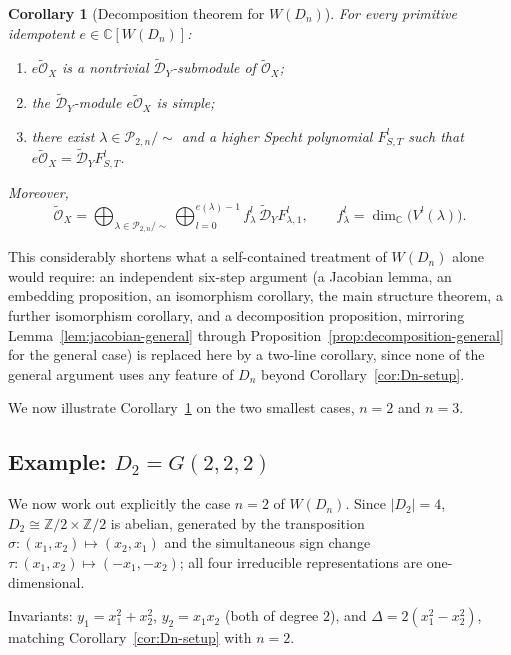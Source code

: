 \documentclass[11pt,a4paper]{article}
\newtheorem{corollary}[theorem]{Corollary}
\begin{document}
\begin{corollary}[Decomposition theorem for $W(D_n)$]\label{cor:Dn-main}
For every primitive idempotent $e \in \mathbb{C}[W(D_n)]$:
\begin{enumerate}[label=(\roman*)]
  \item $e\widetilde{\mathcal{O}}_X$ is a nontrivial
    $\widetilde{\mathcal{D}}_Y$-submodule of $\widetilde{\mathcal{O}}_X$;
  \item the $\widetilde{\mathcal{D}}_Y$-module $e\widetilde{\mathcal{O}}_X$
    is simple;
  \item there exist $\lambda \in \mathcal{P}_{2,n}/\sim$ and a higher
    Specht polynomial $F^l_{S,T}$ such that
    $e\widetilde{\mathcal{O}}_X = \widetilde{\mathcal{D}}_Y F^l_{S,T}$.
\end{enumerate}
Moreover,
\[
  \widetilde{\mathcal{O}}_X = \bigoplus_{\lambda \in \mathcal{P}_{2,n}/\sim}
    \bigoplus_{l=0}^{e(\lambda)-1} f^l_\lambda\,
    \widetilde{\mathcal{D}}_Y F^l_{\lambda,1},
  \qquad f^l_\lambda = \dim_{\mathbb{C}}\big(V^l(\lambda)\big).
\]
\end{corollary}

This considerably shortens what a self-contained treatment of
$W(D_n)$ alone would require: an independent six-step argument (a
Jacobian lemma, an embedding proposition, an isomorphism corollary,
the main structure theorem, a further isomorphism corollary, and a
decomposition proposition, mirroring
Lemma~\ref{lem:jacobian-general} through
Proposition~\ref{prop:decomposition-general} for the general case) is
replaced here by a two-line corollary, since none of the general
argument uses any feature of $D_n$ beyond Corollary~\ref{cor:Dn-setup}.

We now illustrate Corollary~\ref{cor:Dn-main} on the two smallest
cases, $n=2$ and $n=3$.

\subsection{Example: $D_2 = G(2,2,2)$}\label{subsec:D2-example}

We now work out explicitly the case $n=2$ of $W(D_n)$. Since $|D_2|=4$, $D_2 \cong \mathbb{Z}/2\times\mathbb{Z}/2$ is
abelian, generated by the transposition
$\sigma:(x_1,x_2)\mapsto(x_2,x_1)$ and the simultaneous sign change
$\tau:(x_1,x_2)\mapsto(-x_1,-x_2)$; all four irreducible
representations are one-dimensional.

Invariants: $y_1=x_1^2+x_2^2$, $y_2=x_1x_2$ (both of degree $2$), and
$\Delta = 2(x_1^2-x_2^2)$, matching Corollary~\ref{cor:Dn-setup} with $n=2$.
\end{document}
